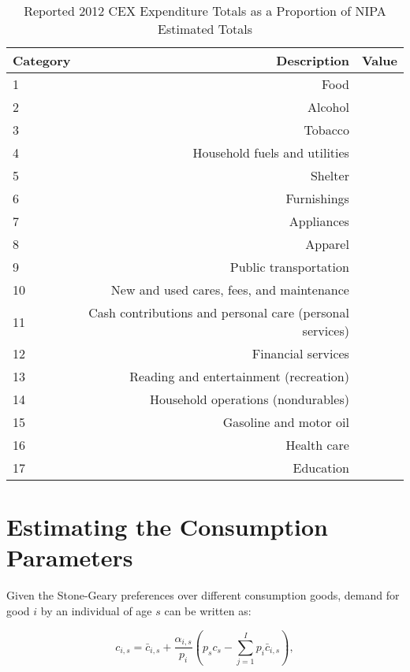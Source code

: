 \documentclass[article,11pt,letterpaper,fleqn]{article}
\theoremstyle{definition}
\numberwithin{equation}{section}
\begin{document}
\begin{table}[h!]
  \centering
  \caption{Reported 2012 CEX Expenditure Totals as a Proportion of NIPA Estimated Totals}
    \begin{tabular}{lrr}
    \hline
    \hline
    Category & Description & Value \\
    \hline
    1     & Food  &  \\
    2     & Alcohol &  \\
    3     & Tobacco &  \\
    4     & Household fuels and utilities &  \\
    5     & Shelter &  \\
    6     & Furnishings &  \\
    7     & Appliances &  \\
    8     & Apparel &  \\
    9     & Public transportation &  \\
    10    & New and used cares, fees, and maintenance &  \\
    11    & Cash contributions and personal care (personal services) &  \\
    12    & Financial services &  \\
    13    & Reading and entertainment (recreation) &  \\
    14    & Household operations (nondurables) &  \\
    15    & Gasoline and motor oil &  \\
    16    & Health care &  \\
    17    & Education &  \\
    \hline
    \hline
    \end{tabular}%
  \label{tab:CEX_NIPA}%
\end{table}%


\section{Estimating the Consumption Parameters}

Given the Stone-Geary preferences over different consumption goods, demand for good $i$ by an individual of age $s$ can be written as:

\begin{equation}
\label{eqn:c_demand}
c_{i,s}=\bar{c}_{i,s} + \frac{\alpha_{i,s}}{p_{i}}\left(p_{s}c_{s}-\sum_{j=1}^{I}p_{i}\bar{c}_{i,s}\right),
\end{equation}
\end{document}
